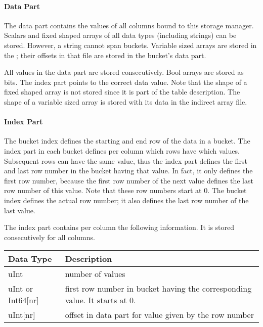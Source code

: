 \paragraph{Data Part\\}
The data part contains the values of all columns bound to this storage
manager. Scalars and fixed shaped arrays of all data types (including
strings) can be stored. However, a string cannot span buckets. 
Variable sized arrays are stored in the
; their offsets in that file are
stored in the bucket's data part. 

All values in the data part are stored consecutively. Bool arrays are
stored as bits. The index part points to the correct data value.
Note that the shape of a fixed shaped array is not
stored since it is part of the table description. The shape of a variable
sized array is stored with its data in the indirect array file.

\paragraph{Index Part\\}
The bucket index defines the starting and end row of the data in a
bucket. The index part in each bucket defines per column which rows
have which values. Subsequent rows can have the same value, thus the
index part defines the first and last row number in the bucket having
that value. In fact, it only defines the first row number, because the
first row number of the next value defines the last row number of this
value. Note that these row numbers start at 0. The bucket index
defines the actual row number; it also defines the last row number of
the last value.

The index part contains per column the following information. It is
stored consecutively for all columns.

\vspace{0.15in}
\begin{tabular}{|l|p{13cm}|} \hline
  Data Type & Description \\ \hline\hline
  uInt & number of values \\
  uInt or Int64[nr] & first row number in bucket having the
                      corresponding value. It starts at 0. \\
  uInt[nr] & offset in data part for value given by the row number \\
  \hline
\end{tabular}
\vspace{0.15in}

